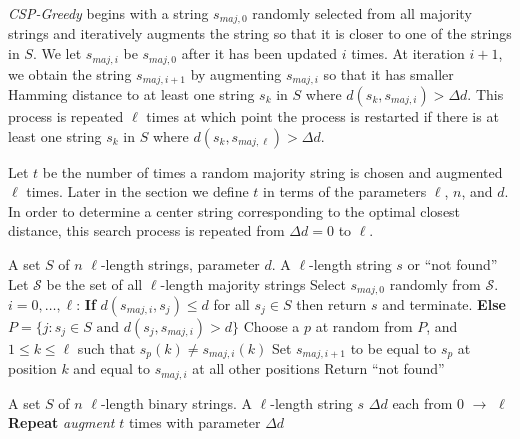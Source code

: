 {\em CSP-Greedy} begins with a string $s_{maj, 0}$ randomly selected from all majority strings and iteratively augments the string so that it is closer to one of the strings in $S$.  We let $s_{maj, i}$ be $s_{maj, 0}$ after it has been updated $i$ times.  At iteration $i + 1$, we obtain the string $s_{maj, i + 1}$ by augmenting $s_{maj, i}$ so that it has smaller Hamming distance to at least one string $s_k$ in $S$ where $d(s_k, s_{maj, i}) > \Delta d$. This process is repeated $\ell$ times at which point the process is restarted if there is at least one string $s_k$ in $S$ where $d(s_k, s_{maj, \ell}) > \Delta d$.  

Let $t$ be the number of times a random majority string is chosen and augmented $\ell$ times. Later in the section we define $t$ in terms of the parameters $\ell$, $n$, and $d$.   In order to determine a center string corresponding to the optimal closest distance, this search process is repeated from $\Delta d = 0$ to $\ell$.

\begin{algorithm*}[h]
\caption{Procedure {\em augment}}
\begin{algorithmic}
 A set $S$ of $n$ $\ell$-length strings, parameter $d$.
 A $\ell$-length string $s$ or ``not found'' 
\STATE Let $\mathcal{S}$ be the set of all $\ell$-length majority strings
\STATE Select $s_{maj, 0}$ randomly from $\mathcal{S}$.
 $i = 0, \ldots, \ell$:
\STATE \hspace{5mm} {\bf If} $d(s_{maj, i}, s_j) \leq d$ for all $s_j \in S$ then return $s$ and terminate. 
\STATE \hspace{5mm} {\bf Else} $P = \{j: s_j \in S \mbox{ and } d(s_j, s_{maj, i}) > d \}$ 
\STATE \hspace{5mm} Choose a $p$ at random from $P$, and $1 \leq k \leq \ell$ such that $s_p(k) \ne s_{maj, i}(k)$
\STATE \hspace{5mm} Set $s_{maj, i + 1}$ to be equal to $s_p$ at position $k$ and equal to $s_{maj, i}$ at all other 
\STATE \hspace{5mm} positions 
\STATE Return ``not found''
\end{algorithmic}
\end{algorithm*}

\begin{algorithm}[h]
\caption{CSP-Greedy Algorithm}
\begin{algorithmic}
 A set $S$ of $n$ $\ell$-length binary strings.
 A $\ell$-length string $s$ 
 $\Delta d$ each from 0 $\rightarrow$ $\ell$ 
\STATE \hspace{5mm} {\bf Repeat} {\em augment} $t$ times with parameter $\Delta d$
\end{algorithmic}
\end{algorithm}


